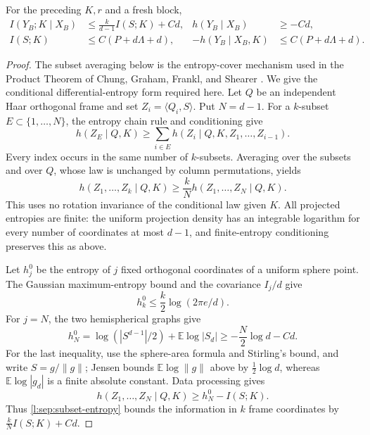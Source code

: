 \begin{lemma}
\label{l:sep:information}
For the preceding \(K,r\) and a fresh block,
\begin{align}
 I(Y_B;K\mid X_B)&\le\frac{k}{d-1}I(S;K)+Cd,
 &h(Y_B\mid X_B)&\ge-Cd,
 \label{l:sep:subset-bounds}\\
 I(S;K)&\le C(P+d\Lambda+d),
 &-h(Y_B\mid X_B,K)&\le C(P+d\Lambda+d).
 \label{l:sep:information-bounds}
\end{align}
\end{lemma}
\begin{proof}
The subset averaging below is the entropy-cover mechanism used in
the Product Theorem of Chung, Graham, Frankl, and Shearer
\cite[Section~V, Equation~(22), pp.~33--34]{ChungGrahamFranklShearer1986}.
We give the conditional differential-entropy form required here.
Let \(Q\) be an independent Haar orthogonal frame and set
\(Z_i=\langle Q_i,S\rangle\).  Put \(N=d-1\).  For a
\(k\)-subset \(E\subset\{1,\ldots,N\}\), the entropy chain rule and
conditioning give
\[
 h(Z_E\mid Q,K)
 \ge\sum_{i\in E}h(Z_i\mid Q,K,Z_1,\ldots,Z_{i-1}).
\]
Every index occurs in the same number of \(k\)-subsets.  Averaging
over the subsets and over \(Q\), whose law is unchanged by column
permutations, yields
\begin{equation}
 h(Z_1,\ldots,Z_k\mid Q,K)
 \ge\frac{k}{N}h(Z_1,\ldots,Z_N\mid Q,K).
 \label{l:sep:subset-entropy}
\end{equation}
This uses no rotation invariance of the conditional law given \(K\).
All projected entropies are finite: the uniform projection density
has an integrable logarithm for every number of coordinates at most
\(d-1\), and finite-entropy conditioning preserves this as above.

Let \(h_j^0\) be the entropy of \(j\) fixed orthogonal coordinates
of a uniform sphere point.  The Gaussian maximum-entropy bound and
the covariance \(I_j/d\) give
\[
 h_k^0\le\frac{k}{2}\log(2\pi e/d).
\]
For \(j=N\), the two hemispherical graphs give
\[
 h_N^0=\log(|S^{d-1}|/2)+\mathbb E\log|S_d|
       \ge-\frac{N}{2}\log d-Cd.
\]
For the last inequality, use the sphere-area formula and Stirling's
bound, and write \(S=g/\|g\|\); Jensen bounds
\(\mathbb E\log\|g\|\) above by \(\tfrac12\log d\), whereas
\(\mathbb E\log|g_d|\) is a finite absolute constant.
Data processing gives
\[
 h(Z_1,\ldots,Z_N\mid Q,K)\ge h_N^0-I(S;K).
\]
Thus \eqref{l:sep:subset-entropy} bounds the information in \(k\)
frame coordinates by \(\tfrac{k}{N}I(S;K)+Cd\).


\end{proof}
